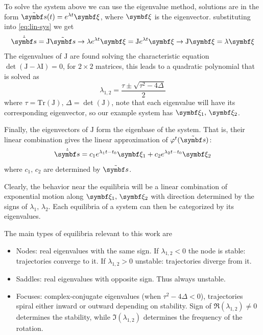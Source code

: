 To solve the system above we can use the eigenvalue method, solutions are in the form $\tilde{\vb{s}}(t) = e^{\lambda t}\vb{\xi}$, where $\vb{\xi}$ is the eigenvector. 
substituting into \ref{eq:lin-sys} we get
\begin{equation}
    \label{eq:sol-to-linsys}
    \dot{\tilde{\vb{s}}} = \mathrm{J}\tilde{\vb{s}} \to \lambda e^{\lambda t}\vb{\xi} =\mathrm{J} e^{\lambda t}\vb{\xi} \to \mathrm{J} \vb{\xi} = \lambda \vb{\xi}  
\end{equation}
The eigenvalues of $\mathrm{J}$ are found solving the characteristic equation $\det\left(\mathrm{J} - \lambda \mathrm{I}\right) = 0$, for $2 \times 2$ matrices, this leads to a quadratic polynomial that is solved as
\begin{equation}
    \lambda_{1,2} = \frac{\tau \pm \sqrt{\tau^2 - 4 \Delta}}{2}
\end{equation}
where $\tau = \mathrm{Tr}(\mathrm{J}) \text{, } \Delta = \det(\mathrm{J})$, note that each eigenvalue will have its corresponding eigenvector, so our example system has $\vb{\xi}_1 \text{, } \vb{\xi}_2$.

Finally, the eigenvectors of $\mathrm{J}$ form the eigenbase of the system. That is, their linear combination gives the linear approximation of $\varphi^{t}(\tilde{\vb{s}})$:
\begin{equation}
    \dot{\tilde{\vb{s}}} = c_1 e^{\lambda_1 t-t_0}\vb{\xi}_1 + c_2 e^{\lambda_2 t-t_0}\vb{\xi}_2
\end{equation}
where $c_1 \text{, } c_2$ are determined by $\tilde{\vb{s}}$.

Clearly, the behavior near the equilibria will be a linear combination of exponential motion along $\vb{\xi}_1 \text{, }\vb{\xi}_2$ with direction determined by the signs of $\lambda_1 \text{, } \lambda_2$.
Each equilibria of a system can then be categorized by its eigenvalues.

The main types of equilibria relevant to this work are

\begin{itemize}
    \item Nodes: real eigenvalues with the same sign. If $\lambda_{1,2} < 0$ the node is stable: trajectories converge to it. If $\lambda_{1,2} > 0$ unstable: trajectories diverge from it.
    \item Saddles: real eigenvalues with opposite sign. Thus always unstable.
    \item Focuses: complex-conjugate eigenvalues (when $\tau^2 - 4\Delta < 0$), trajectories spiral either inward or outward depending on stability. Sign of $\Re(\lambda_{1,2}) \neq 0$ determines the stability, while $\Im(\lambda_{1,2})$ determines the frequency of the rotation.
\end{itemize}

